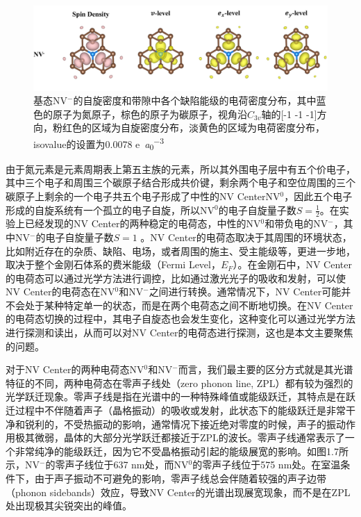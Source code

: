 \documentclass[type = bachelor]{whu-thesis}
\begin{document}
\begin{figure}
  \centering
  \includegraphics[width=1.0\textwidth]{figures/Chapter 1/Spin and Charge Density.png}
  \caption[基态NV$^-$的自旋密度和带隙中各个缺陷能级的电荷密度分布]{基态NV$^-$的自旋密度和带隙中各个缺陷能级的电荷密度分布，其中蓝色的原子为氮原子，棕色的原子为碳原子，视角沿$C_{3v}$轴的[-1 -1 -1]方向，粉红色的区域为自旋密度分布，淡黄色的区域为电荷密度分布，isovalue的设置为0.0078 \unit{e\per\bohr\cubed}}
  \label{fig: Spin and Charge Density}
\end{figure}

由于氮元素是元素周期表上第五主族的元素，所以其外围电子层中有五个价电子，其中三个电子和周围三个碳原子结合形成共价键，剩余两个电子和空位周围的三个碳原子上剩余的一个电子共五个电子形成了中性的NV CenterNV$^0$，因此五个电子形成的自旋系统有一个孤立的电子自旋，所以NV$^0$的电子自旋量子数$S=\frac{1}{2}$。在实验上已经发现的NV Center的两种稳定的电荷态，中性的NV$^0$和带负电的NV$^-$，其中NV$^-$的电子自旋量子数$S=1$ \cite{waldherr2011dark,aslam2013photo,dolde2014nanoscale}。NV Center的电荷态取决于其周围的环境状态，比如附近存在的杂质、缺陷、电场，或者周围的施主、受主能级等，更进一步地，取决于整个金刚石体系的费米能级（Fermi Level，$E_F$）\cite{doherty2013nitrogen}。在金刚石中，NV Center的电荷态可以通过光学方法进行调控，比如通过激光光子的吸收和发射，可以使NV Center的电荷态在NV$^0$和NV$^-$之间进行转换\cite{doi2016pure,siyushev2013optically,shields2015efficient}。通常情况下，NV Center可能并不会处于某种特定单一的状态，而是在两个电荷态之间不断地切换。在NV Center的电荷态切换的过程中，其电子自旋态也会发生变化，这种变化可以通过光学方法进行探测和读出，从而可以对NV Center的电荷态进行探测，这也是本文主要聚焦的问题。

对于NV Center的两种电荷态NV$^0$和NV$^-$而言，我们最主要的区分方式就是其光谱特征的不同，两种电荷态在零声子线处（zero phonon line, ZPL）都有较为强烈的光学跃迁现象。零声子线是指在光谱中的一种特殊峰值或能级跃迁，其特点是在跃迁过程中不伴随着声子（晶格振动）的吸收或发射，此状态下的能级跃迁是非常干净和锐利的，不受热振动的影响，通常情况下接近绝对零度的时候，声子的振动作用极其微弱，晶体的大部分光学跃迁都接近于ZPL的波长。零声子线通常表示了一个非常纯净的能级跃迁，因为它不受晶格振动引起的能级展宽的影响。如图1.7所示，NV$^-$的零声子线位于637 nm处，而NV$^0$的零声子线位于575 nm处。在室温条件下，由于声子振动不可避免的影响，零声子线总会伴随着较强的声子边带（phonon sidebands）效应，导致NV Center的光谱出现展宽现象，而不是在ZPL处出现极其尖锐突出的峰值。
\end{document}
